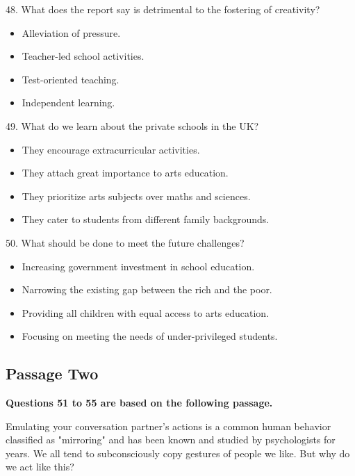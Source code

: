 \documentclass[UTF8,11pt]{ctexart}
\begin{document}
48. What does the report say is detrimental to the fostering of creativity?


\begin{itemize}[leftmargin=2em,itemsep=.2em,topsep=.4em]\item[A.] Alleviation of pressure.
\item[B.] Teacher-led school activities.
\item[C.] Test-oriented teaching.
\item[D.] Independent learning.
\end{itemize}

49. What do we learn about the private schools in the UK?


\begin{itemize}[leftmargin=2em,itemsep=.2em,topsep=.4em]\item[A.] They encourage extracurricular activities.
\item[B.] They attach great importance to arts education.
\item[C.] They prioritize arts subjects over maths and sciences.
\item[D.] They cater to students from different family backgrounds.
\end{itemize}

50. What should be done to meet the future challenges?


\begin{itemize}[leftmargin=2em,itemsep=.2em,topsep=.4em]\item[A.] Increasing government investment in school education.
\item[B.] Narrowing the existing gap between the rich and the poor.
\item[C.] Providing all children with equal access to arts education.
\item[D.] Focusing on meeting the needs of under-privileged students.
\end{itemize}

\subsection*{\textbf{Passage Two}}


\textbf{Questions 51 to 55 are based on the following passage.}


Emulating your conversation partner's actions is a common human behavior classified as "mirroring" and has been known and studied by psychologists for years. We all tend to subconsciously copy gestures of people we like. But why do we act like this?
\end{document}
